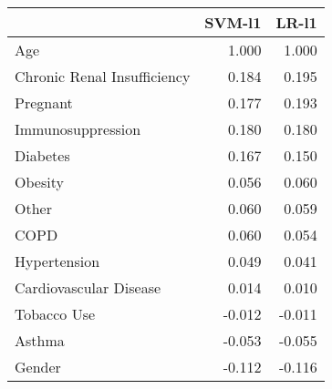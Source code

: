 \begin{tabular}{lrr}
\toprule
{} &  SVM-l1 &  LR-l1 \\
\midrule
Age                         &   1.000 &  1.000 \\
Chronic Renal Insufficiency &   0.184 &  0.195 \\
Pregnant                    &   0.177 &  0.193 \\
Immunosuppression           &   0.180 &  0.180 \\
Diabetes                    &   0.167 &  0.150 \\
Obesity                     &   0.056 &  0.060 \\
Other                       &   0.060 &  0.059 \\
COPD                        &   0.060 &  0.054 \\
Hypertension                &   0.049 &  0.041 \\
Cardiovascular Disease      &   0.014 &  0.010 \\
Tobacco Use                 &  -0.012 & -0.011 \\
Asthma                      &  -0.053 & -0.055 \\
Gender                      &  -0.112 & -0.116 \\
\bottomrule
\end{tabular}
